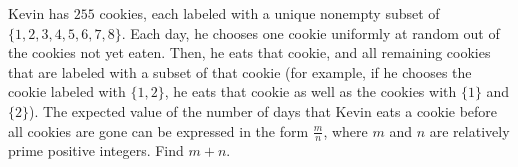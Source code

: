 Kevin has $255$ cookies, each labeled with a unique nonempty subset of $\{1,2,3,4,5,6,7,8\}$. Each day, he chooses one cookie uniformly at random out of the cookies not yet eaten. Then, he eats that cookie, and all remaining cookies that are labeled with a subset of that cookie (for example, if he chooses the cookie labeled with $\{1,2\}$, he eats that cookie as well as the cookies with $\{1\}$ and $\{2\}$). The expected value of the number of days that Kevin eats a cookie before all cookies are gone can be expressed in the form $\frac{m}{n}$, where $m$ and $n$ are relatively prime positive integers. Find $m + n$.
